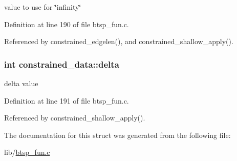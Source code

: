 value to use for \char`\"{}infinity\char`\"{} 

Definition at line 190 of file btsp\_\-fun.c.

Referenced by constrained\_\-edgelen(), and constrained\_\-shallow\_\-apply().\hypertarget{structconstrained__data_1f33c1fc7b0fdcb2771167f061ff4724}{
\subsubsection{\setlength{\rightskip}{0pt plus 5cm}int {\bf constrained\_\-data::delta}}}
\label{structconstrained__data_1f33c1fc7b0fdcb2771167f061ff4724}


delta value 

Definition at line 191 of file btsp\_\-fun.c.

Referenced by constrained\_\-shallow\_\-apply().

The documentation for this struct was generated from the following file:\begin{CompactItemize}
\item 
lib/\hyperlink{btsp__fun_8c}{btsp\_\-fun.c}\end{CompactItemize}
